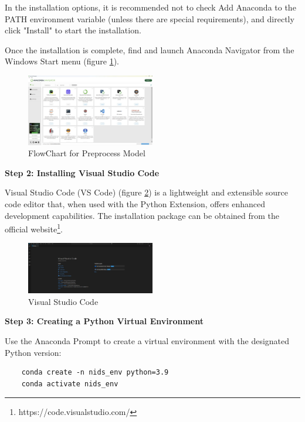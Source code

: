 \begin{ZhChapter}
    In the installation options, it is recommended not to check Add Anaconda to the PATH environment variable (unless there are special requirements), and directly click "Install" to start the installation.

    Once the installation is complete, find and launch Anaconda Navigator from the Windows Start menu (figure \ref{fig: AnacondaMenu}).
    \begin{figure}[htbp]
        \centering
        \includegraphics[width = 0.5\textwidth]{image/AnacondaMenu.jpg}
        \caption{FlowChart for Preprocess Model}
        \label{fig: AnacondaMenu}
    \end{figure}




    \textbf{Step 2: Installing Visual Studio Code}

    Visual Studio Code (VS Code) (figure \ref{fig: VS}) is a lightweight and extensible source code editor that, when used with the Python Extension, offers enhanced development capabilities. The installation package can be obtained from the official website\footnote{https://code.visualstudio.com/}.

    \begin{figure}[htbp]
        \centering
        \includegraphics[width = 0.5\textwidth]{image/VS.jpg}
        \caption{Visual Studio Code}
        \label{fig: VS}
    \end{figure}

    \textbf{Step 3: Creating a Python Virtual Environment}

    Use the Anaconda Prompt to create a virtual environment with the designated Python version:
    \begin{verbatim}
    conda create -n nids_env python=3.9
    conda activate nids_env
    \end{verbatim}


\end{ZhChapter}

